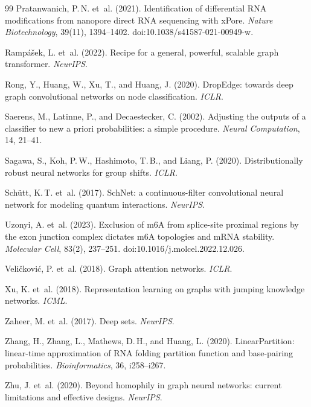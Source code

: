 \documentclass[11pt,a4paper]{article}
\begin{document}
\begin{thebibliography}{99}
    Pratanwanich, P.\,N. et~al. (2021).
    \newblock Identification of differential RNA modifications from nanopore direct RNA sequencing with xPore.
    \newblock \textit{Nature Biotechnology}, 39(11), 1394--1402. doi:10.1038/s41587-021-00949-w.

    Rampášek, L. et~al. (2022).
    \newblock Recipe for a general, powerful, scalable graph transformer.
    \newblock \textit{NeurIPS}.

    Rong, Y., Huang, W., Xu, T., and Huang, J. (2020).
    \newblock DropEdge: towards deep graph convolutional networks on node classification.
    \newblock \textit{ICLR}.

    Saerens, M., Latinne, P., and Decaestecker, C. (2002).
    \newblock Adjusting the outputs of a classifier to new a priori probabilities: a simple procedure.
    \newblock \textit{Neural Computation}, 14, 21--41.

    Sagawa, S., Koh, P.\,W., Hashimoto, T.\,B., and Liang, P. (2020).
    \newblock Distributionally robust neural networks for group shifts.
    \newblock \textit{ICLR}.

    Sch\"utt, K.\,T. et~al. (2017).
    \newblock SchNet: a continuous-filter convolutional neural network for modeling quantum interactions.
    \newblock \textit{NeurIPS}.

    Uzonyi, A. et~al. (2023).
    \newblock Exclusion of m6A from splice-site proximal regions by the exon junction complex dictates m6A topologies and mRNA stability.
    \newblock \textit{Molecular Cell}, 83(2), 237--251. doi:10.1016/j.molcel.2022.12.026.

    Veličković, P. et~al. (2018).
    \newblock Graph attention networks.
    \newblock \textit{ICLR}.

    Xu, K. et~al. (2018).
    \newblock Representation learning on graphs with jumping knowledge networks.
    \newblock \textit{ICML}.

    Zaheer, M. et~al. (2017).
    \newblock Deep sets.
    \newblock \textit{NeurIPS}.

    Zhang, H., Zhang, L., Mathews, D.\,H., and Huang, L. (2020).
    \newblock LinearPartition: linear-time approximation of RNA folding partition function and base-pairing probabilities.
    \newblock \textit{Bioinformatics}, 36, i258--i267.

    Zhu, J. et~al. (2020).
    \newblock Beyond homophily in graph neural networks: current limitations and effective designs.
    \newblock \textit{NeurIPS}.
\end{thebibliography}
\end{document}
